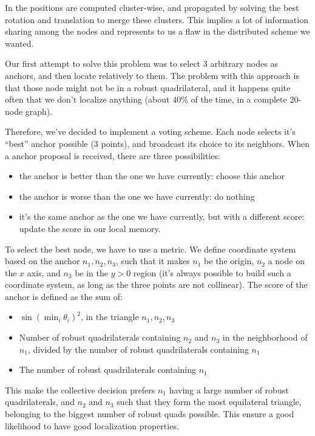 \documentclass[letterpaper, 10 pt, conference]{ieeeconf}  %
\begin{document}
In \cite{MooreTeller} the positions are computed cluster-wise, and propagated by solving the best rotation and translation to merge these clusters. This implies a lot of information sharing among the nodes and represents to us a flaw in the distributed scheme we wanted.

Our first attempt to solve this problem was to select 3 arbitrary nodes as anchors, and then locate relatively to them. The problem with this approach is that those node might not be in a robust quadrilateral, and it happens quite often that we don't localize anything (about 40\% of the time, in a complete 20-node graph).

Therefore, we've decided to implement a voting scheme. Each node selects it's ``best'' anchor possible (3 points), and broadcast its choice to its neighbors. When a anchor proposal is received, there are three possibilities:
\begin{itemize}
    \item the anchor is better than the one we have currently: choose this anchor
    \item the anchor is worse than the one we have currently: do nothing
    \item it's the same anchor as the one we have currently, but with a different score: update the score in our local memory.
\end{itemize}

To select the best node, we have to use a metric. We define coordinate system based on the anchor $n_1, n_2, n_3$, such that it makes $n_1$ be the origin, $n_2$ a node on the $x$ axis, and $n_3$ be in the $y>0$ region (it's always possible to build such a coordinate system, as long as the three points are not collinear). The score of the anchor is defined as the sum of:
\begin{itemize}
    \item $\sin(\min_i \theta_i)^2$, in the triangle $n_1, n_2, n_3$
    \item Number of robust quadrilaterals containing $n_2$ and $n_3$ in the neighborhood of $n_1$, divided by the number of robust quadrilaterals containing $n_1$
    \item The number of robust quadrilaterals containing $n_1$
\end{itemize}

This make the collective decision prefers $n_1$ having a large number of robust quadrilaterals, and $n_2$ and $n_3$ such that they form the most equilateral triangle, belonging to the biggest number of robust quads possible. This ensure a good likelihood to have good localization properties.
\end{document}
